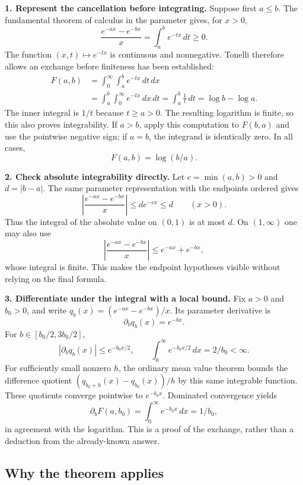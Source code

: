 \documentclass[
  11pt,
]{article}
\begin{document}
\textbf{1. Represent the cancellation before integrating.} Suppose first
\(a\le b\). The fundamental theorem of calculus in the parameter gives,
for \(x>0\), \[
\frac{e^{-ax}-e^{-bx}}{x}=\int_a^b e^{-tx}\,dt\ge0.
\] The function \((x,t)\mapsto e^{-tx}\) is continuous and nonnegative.
Tonelli therefore allows an exchange before finiteness has been
established: \[
\begin{aligned}
F(a,b)&=\int_0^{\infty}\int_a^b e^{-tx}\,dt\,dx\\
&=\int_a^b\int_0^{\infty}e^{-tx}\,dx\,dt
=\int_a^b\frac{1}{t}\,dt
=\log b-\log a.
\end{aligned}
\] The inner integral is \(1/t\) because \(t\ge a>0\). The resulting
logarithm is finite, so this also proves integrability. If \(a>b\),
apply this computation to \(F(b,a)\) and use the pointwise negative
sign; if \(a=b\), the integrand is identically zero. In all cases, \[
\boxed{F(a,b)=\log(b/a).}
\]

\textbf{2. Check absolute integrability directly.} Let \(c=\min(a,b)>0\)
and \(d=|b-a|\). The same parameter representation with the endpoints
ordered gives \[
\left|\frac{e^{-ax}-e^{-bx}}{x}\right|
\le d e^{-cx}\le d\qquad(x>0).
\] Thus the integral of the absolute value on \((0,1)\) is at most
\(d\). On \((1,\infty)\) one may also use \[
\left|\frac{e^{-ax}-e^{-bx}}{x}\right|
\le e^{-ax}+e^{-bx},
\] whose integral is finite. This makes the endpoint hypotheses visible
without relying on the final formula.

\textbf{3. Differentiate under the integral with a local bound.} Fix
\(a>0\) and \(b_0>0\), and write \(q_b(x)=(e^{-ax}-e^{-bx})/x\). Its
parameter derivative is \[
\partial_b q_b(x)=e^{-bx}.
\] For \(b\in[b_0/2,3b_0/2]\), \[
|\partial_b q_b(x)|\le e^{-b_0x/2},\qquad
\int_0^{\infty}e^{-b_0x/2}\,dx=2/b_0<\infty.
\] For sufficiently small nonzero \(h\), the ordinary mean value theorem
bounds the difference quotient \((q_{b_0+h}(x)-q_{b_0}(x))/h\) by this
same integrable function. These quotients converge pointwise to
\(e^{-b_0x}\). Dominated convergence yields \[
\partial_b F(a,b_0)=\int_0^{\infty}e^{-b_0x}\,dx=1/b_0,
\] in agreement with the logarithm. This is a proof of the exchange,
rather than a deduction from the already-known answer.

\subsection{Why the theorem applies}\label{why-the-theorem-applies-5}
\end{document}
